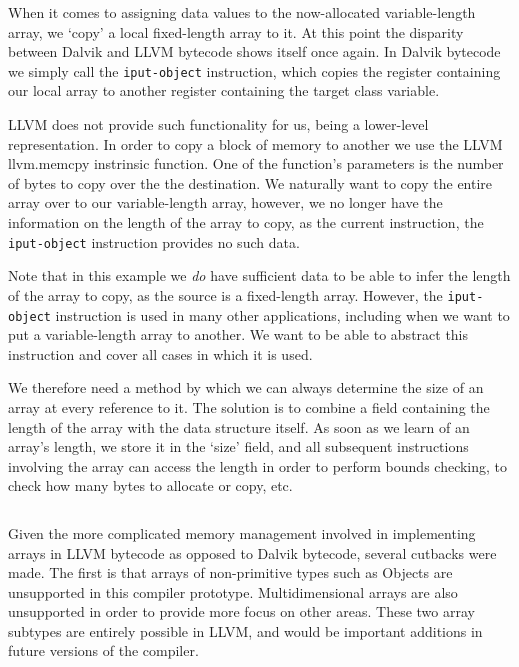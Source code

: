 \begin{lstlisting}[frame=single, caption={LLVM pointer array}, label=lst:llvm_ptr]
%a = i32*
\end{lstlisting}

When it comes to assigning data values to the now-allocated variable-length array, we `copy' a local fixed-length array to it. At this point the disparity between Dalvik and LLVM bytecode shows itself once again. In Dalvik bytecode we simply call the \verb|iput-object| instruction, which copies the register containing our local array to another register containing the target class variable.

LLVM does not provide such functionality for us, being a lower-level representation. In order to copy a block of memory to another we use the LLVM llvm.memcpy instrinsic function. One of the function's parameters is the number of bytes to copy over the the destination. We naturally want to copy the entire array over to our variable-length array, however, we no longer have the information on the length of the array to copy, as the current instruction, the \verb|iput-object| instruction provides no such data.

Note that in this example we \textit{do} have sufficient data to be able to infer the length of the array to copy, as the source is a fixed-length array. However, the \verb|iput-object| instruction is used in many other applications, including when we want to put a variable-length array to another. We want to be able to abstract this instruction and cover all cases in which it is used.


We therefore need a method by which we can always determine the size of an array at every reference to it. The solution is to combine a field containing the length of the array with the data structure itself. As soon as we learn of an array's length, we store it in the `size' field, and all subsequent instructions involving the array can access the length in order to perform bounds checking, to check how many bytes to allocate or copy, etc.

\lstset{
	language=Assembly,
	basicstyle=\small,
	stringstyle=\ttfamily
}
\begin{lstlisting}[frame=single]
%struct_array = { i32, i32* }
\end{lstlisting}

Given the more complicated memory management involved in implementing arrays in LLVM bytecode as opposed to Dalvik bytecode, several cutbacks were made. The first is that arrays of non-primitive types such as Objects are unsupported in this compiler prototype. Multidimensional arrays are also unsupported in order to provide more focus on other areas. These two array subtypes are entirely possible in LLVM, and would be important additions in future versions of the compiler.
